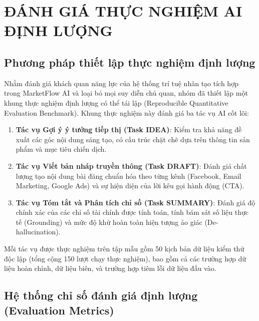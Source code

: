 \chapter{ĐÁNH GIÁ THỰC NGHIỆM AI ĐỊNH LƯỢNG}

\section{Phương pháp thiết lập thực nghiệm định lượng}

Nhằm đánh giá khách quan năng lực của hệ thống trí tuệ nhân tạo tích hợp trong MarketFlow AI và loại bỏ mọi suy diễn chủ quan, nhóm đã thiết lập một khung thực nghiệm định lượng có thể tái lập (Reproducible Quantitative Evaluation Benchmark). Khung thực nghiệm này đánh giá ba tác vụ AI cốt lõi:
\begin{enumerate}
  \item \textbf{Tác vụ Gợi ý ý tưởng tiếp thị (Task IDEA)}: Kiểm tra khả năng đề xuất các góc nội dung sáng tạo, có cấu trúc chặt chẽ dựa trên thông tin sản phẩm và mục tiêu chiến dịch.
  \item \textbf{Tác vụ Viết bản nháp truyền thông (Task DRAFT)}: Đánh giá chất lượng tạo nội dung bài đăng chuẩn hóa theo từng kênh (Facebook, Email Marketing, Google Ads) và sự hiện diện của lời kêu gọi hành động (CTA).
  \item \textbf{Tác vụ Tóm tắt và Phân tích chỉ số (Task SUMMARY)}: Đánh giá độ chính xác của các chỉ số tài chính được tính toán, tính bám sát số liệu thực tế (Grounding) và mức độ khử hoàn toàn hiện tượng ảo giác (De-hallucination).
\end{enumerate}

Mỗi tác vụ được thực nghiệm trên tập mẫu gồm 50 kịch bản dữ liệu kiểm thử độc lập (tổng cộng 150 lượt chạy thực nghiệm), bao gồm cả các trường hợp dữ liệu hoàn chỉnh, dữ liệu biên, và trường hợp tiêm lỗi dữ liệu đầu vào.

\section{Hệ thống chỉ số đánh giá định lượng (Evaluation Metrics)}

